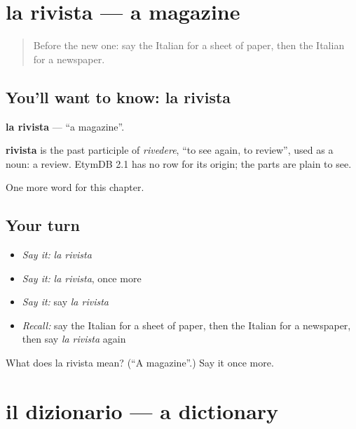 \section[la rivista]{la rivista — a magazine}

\label{lesson:IT-C232-rivista}



\begin{quote}
Before the new one: say the Italian for a sheet of paper, then the Italian for a newspaper.
\end{quote}

\subsection*{You'll want to know: la rivista}
\textbf{la rivista} — \textquotedblleft{}a magazine\textquotedblright{}.

\begin{cousinweb}
\textbf{rivista} is the past participle of \emph{rivedere}, \textquotedblleft{}to see again, to review\textquotedblright{}, used as a noun: a review. EtymDB 2.1 has no row for its origin; the parts are plain to see.
\end{cousinweb}

\begin{grammarlens}[title={What you've built}]
One more word for this chapter.
\end{grammarlens}

\subsection*{Your turn}
\begin{itemize}
\raggedright
  \item \emph{Say it:} \emph{la rivista}
  \item \emph{Say it:} \emph{la rivista}, once more
  \item \emph{Say it:} say \emph{la rivista}
  \item \emph{Recall:} say the Italian for a sheet of paper, then the Italian for a newspaper, then say \emph{la rivista} again
\end{itemize}

\begin{tcolorbox}[breakable,colback=teal!4,colframe=teal!35!black,title={Before you move on}]
What does la rivista mean? (\textquotedblleft{}A magazine\textquotedblright{}.) Say it once more.
\end{tcolorbox}
\section[il dizionario]{il dizionario — a dictionary}

